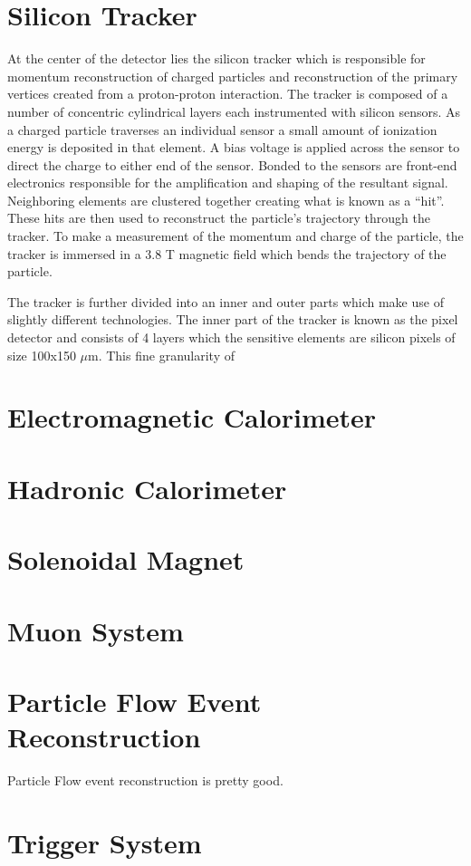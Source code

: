 \section{Silicon Tracker}
At the center of the detector lies the silicon tracker which is responsible for momentum reconstruction of charged particles and reconstruction of the primary vertices created from a proton-proton interaction. The tracker is composed of a number of concentric cylindrical layers each instrumented with silicon sensors. As a charged particle traverses an individual sensor a small amount of ionization energy is deposited in that element. A bias voltage is applied across the sensor to direct the charge to either end of the sensor. Bonded to the sensors are front-end electronics responsible for the amplification and shaping of the resultant signal. Neighboring elements are clustered together creating what is known as a ``hit''. These hits are then used to reconstruct the particle's trajectory through the tracker. To make a measurement of the momentum and charge of the particle, the tracker is immersed in a 3.8 T magnetic field which bends the trajectory of the particle.

The tracker is further divided into an inner and outer parts which make use of slightly different technologies. The inner part of the tracker is known as the pixel detector and consists of 4 layers which the sensitive elements are silicon pixels of size 100x150 $\mu$m. This fine granularity of

\section{Electromagnetic Calorimeter}
\section{Hadronic Calorimeter}
\section{Solenoidal Magnet}
\section{Muon System}
\section{Particle Flow Event Reconstruction}

Particle Flow event reconstruction is pretty good.\cite{CMS-PRF-14-001}
\section{Trigger System}
